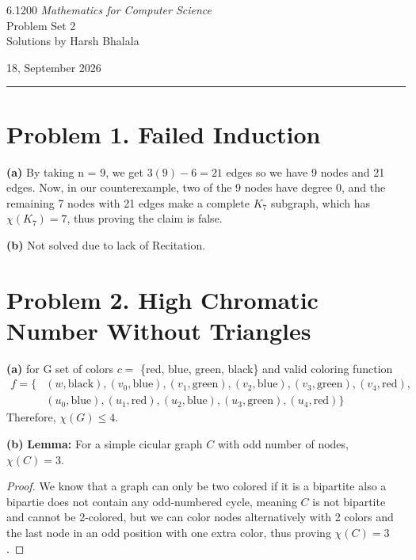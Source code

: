 \documentclass{article}
\begin{document}
\noindent
\begin{minipage}[t]{0.68\textwidth}
{\large 6.1200 \textit{Mathematics for Computer Science}}\\[4pt]
{\large Problem Set 2}\\[4pt]
{\large Solutions by Harsh Bhalala}
\end{minipage}%
\hfill
\begin{minipage}[t]{0.27\textwidth}
\raggedleft
{\large 18, September 2026}
\end{minipage}

\vspace{6pt}

\noindent\rule{\textwidth}{0.5pt}

\section*{Problem 1. Failed Induction}
\textbf{(a)}
    By taking n = 9, we get $3(9) - 6 = 21$ edges so we have 9 nodes and 21 edges.
    Now, in our counterexample, two of the 9 nodes have degree 0, and the remaining 7 nodes with 21 edges make
    a complete $K_7$ subgraph, which has $\chi(K_7) = 7$, thus proving the claim is false.

\vspace{\baselineskip}
\noindent\textbf{(b)} Not solved due to lack of Recitation.

\section*{Problem 2. High Chromatic Number Without Triangles}

\textbf{(a)}
    for G set of colors $c = $ \{red, blue, green, black\} and valid coloring function
    \[
    \begin{aligned}
    f = \{ &(w,\text{black}), (v_0,\text{blue}), (v_1,\text{green}), (v_2,\text{blue}), (v_3,\text{green}), (v_4,\text{red}),\\
    &(u_0,\text{blue}), (u_1,\text{red}), (u_2,\text{blue}), (u_3,\text{green}), (u_4,\text{red})
    \}
    \end{aligned}
    \]
Therefore, $\chi(G) \leq 4$.

\vspace{\baselineskip}
\noindent\textbf{(b)} \textbf{Lemma:} For a simple cicular graph $C$ with odd number of nodes, $\chi(C) = 3$.
\begin{proof}
    We know that a graph can only be two colored if it is a bipartite also a bipartie does not contain any
    odd-numbered cycle, meaning $C$ is not bipartite and cannot be 2-colored, but we can color nodes alternatively with
    2 colors and the last node in an odd position with one extra color, thus proving $\chi(C) = 3$.
\end{proof}
\end{document}
